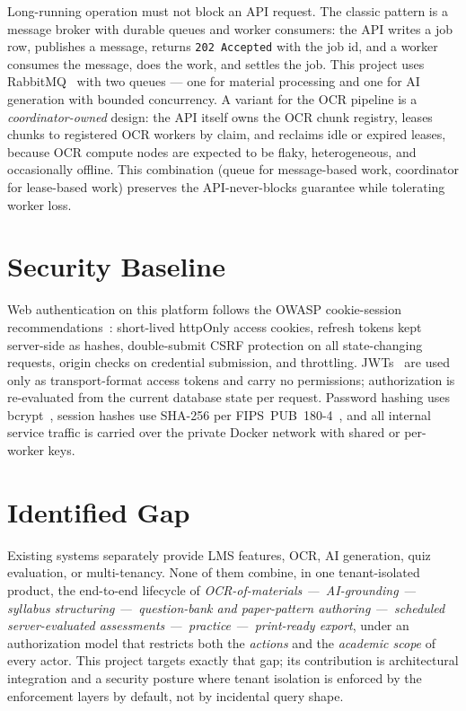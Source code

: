 Long-running operation must not block an API request. The classic pattern is a
message broker with durable queues and worker consumers: the API writes a
job row, publishes a message, returns \texttt{202 Accepted} with the job id,
and a worker consumes the message, does the work, and settles the job. This
project uses RabbitMQ~\cite{rabbitmq} with two queues --- one for material
processing and one for AI generation with bounded concurrency. A variant for
the OCR pipeline is a \emph{coordinator-owned} design: the API itself owns the
OCR chunk registry, leases chunks to registered OCR workers by claim, and
reclaims idle or expired leases, because OCR compute nodes are expected to be
flaky, heterogeneous, and occasionally offline. This combination (queue for
message-based work, coordinator for lease-based work) preserves the
API-never-blocks guarantee while tolerating worker loss.

\section{Security Baseline}

Web authentication on this platform follows the OWASP cookie-session
recommendations~\cite{owaspcsfr, owaspsession}: short-lived httpOnly access
cookies, refresh tokens kept server-side as hashes, double-submit CSRF
protection on all state-changing requests, origin checks on credential
submission, and throttling. JWTs~\cite{rfc7519} are used only as
transport-format access tokens and carry no permissions; authorization is
re-evaluated from the current database state per request. Password hashing
uses bcrypt~\cite{bcrypt}, session hashes use SHA-256 per
FIPS~PUB~180-4~\cite{fips180}, and all internal service traffic is carried
over the private Docker network with shared or per-worker keys.

\section{Identified Gap}

Existing systems separately provide LMS features, OCR, AI generation, quiz
evaluation, or multi-tenancy. None of them combine, in one tenant-isolated
product, the end-to-end lifecycle of \emph{OCR-of-materials ---\,
AI-grounding ---\, syllabus structuring ---\, question-bank and paper-pattern
authoring ---\, scheduled server-evaluated assessments ---\, practice ---\,
print-ready export}, under an authorization model that restricts both the
\emph{actions} and the \emph{academic scope} of every actor. This project
targets exactly that gap; its contribution is architectural integration and a
security posture where tenant isolation is enforced by the enforcement layers
by default, not by incidental query shape.